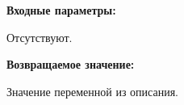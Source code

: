 \textbf{Входные параметры:}

Отсутствуют.

\textbf{Возвращаемое значение:}

Значение переменной из описания.